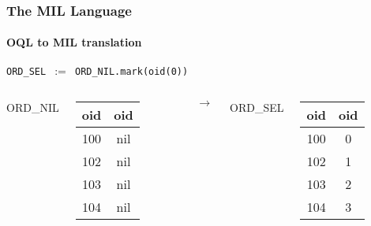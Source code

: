 \documentclass{beamer}
\begin{document}
\begin{frame}
  \frametitle{The MIL Language}
  \framesubtitle{OQL to MIL translation}

  \begin{block}{}
  {\tt ORD\_SEL $:=$ ORD\_NIL.mark(oid(0))}
  \end{block}

  \begin{columns}

  \column{1cm}

  ORD\_NIL
  \begin{tabular}{|c|c|}
    \hline
    oid & oid \\
    \hline
    100 & nil \\
    102 & nil \\
    103 & nil \\
    104 & nil \\
    \hline
  \end{tabular}

  \column{1cm}

  $\longrightarrow$

  \column{1cm}

  ORD\_SEL
  \begin{tabular}{|c|c|}
    \hline
    oid & oid \\
    \hline
    100 & 0 \\
    102 & 1 \\
    103 & 2 \\
    104 & 3 \\
    \hline
  \end{tabular}

  \end{columns}

\end{frame}
\end{document}
